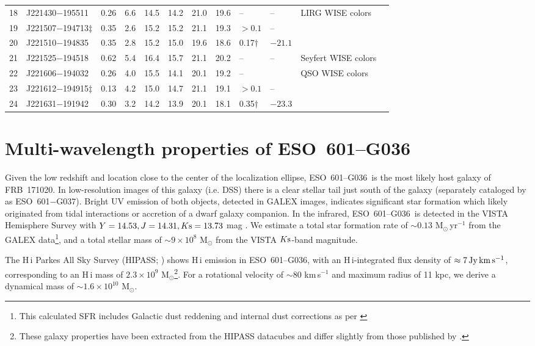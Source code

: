 \documentclass[twocolumn]{aastex63}
\newcommand{\galname}{ESO~601--G036}
\begin{document}
\begin{table*}
\begin{tabular}{llrccccclllc}
18 & J221430$-$195511 & 0.26 & 6.6 & 14.5 & 14.2 & 21.0 & 19.6 & -- & -- & LIRG WISE colors\\
19 & J221507$-$194713$\ddagger$ & 0.35 & 2.6 & 15.2 & 15.2 & 21.1 & 19.3 & $>0.1$ & -- & \\
20 & J221510$-$194835 & 0.35 & 2.8 & 15.2 & 15.0 & 19.6 & 18.6 & 0.17$\dagger$ & $-21.1$ &  \\
21 & J221525$-$194518 & 0.62 & 5.4 & 16.4 & 15.7 & 21.1 & 20.2 & -- & -- & Seyfert WISE colors  \\
22 & J221606$-$194032 & 0.26 & 4.0 & 15.5 & 14.1 & 20.1 & 19.2 & -- & & QSO WISE colors \\
23 & J221612$-$194915$\ddagger$ & 0.13 & 4.2 & 15.0 & 14.7 & 21.1 & 19.1 & $>0.1$ & -- & \\
24 & J221631$-$191942 & 0.30 & 3.2 & 14.2 & 13.9 & 20.1 & 18.1 & 0.35$\dagger$ & $-23.3$ & \\ 
\hline
\end{tabular}
\end{table*}



\section{Multi-wavelength properties of \galname}
Given the low redshift and location close to the center of the localization ellipse, \galname\ is the most likely host galaxy of FRB~171020. In low-resolution images of this galaxy (i.e. DSS) there is a clear stellar tail just south of the galaxy (separately cataloged by \cite{esouppsala} as ESO~601$-$G037). Bright UV emission of both objects, detected in GALEX images, indicates significant star formation which likely originated from tidal interactions or accretion of a dwarf galaxy companion. In the infrared, \galname\ is detected in the VISTA Hemisphere Survey with $Y=14.53, J=14.31, K{\rm s}=13.73$ mag \citep{vista}. We estimate a total star formation rate of $\sim0.13$ M$_\odot$\,yr$^{-1}$ from the {GALEX} data\footnote{This calculated SFR includes Galactic dust reddening and internal dust corrections as per \citet{Wong2016}}, and a total stellar mass of $\sim9\times10^8$ M$_\odot$ from the VISTA $K{\rm s}$-band magnitude.

The \mbox{H\,{\sc i}} Parkes All Sky Survey (HIPASS; \citealt{Barnes2001}) shows \mbox{H\,{\sc i}} emission in \galname, 
with an \mbox{H\,{\sc i}}-integrated flux density of 
$\approx 7\, \rm Jy\,km\,s^{-1}$, corresponding to an \mbox{H\,{\sc i}} mass of $2.3 \times 10^9$ M$_\odot$\footnote{These galaxy properties have been extracted from the HIPASS datacubes and differ slightly from those published by \citet{hipass}.}. For a rotational velocity of $\sim$80 km\,s$^{-1}$ and maximum radius of 11 kpc, we derive a dynamical mass of $\sim 1.6 \times10^{10}$ M$_\odot$.  
\end{document}

